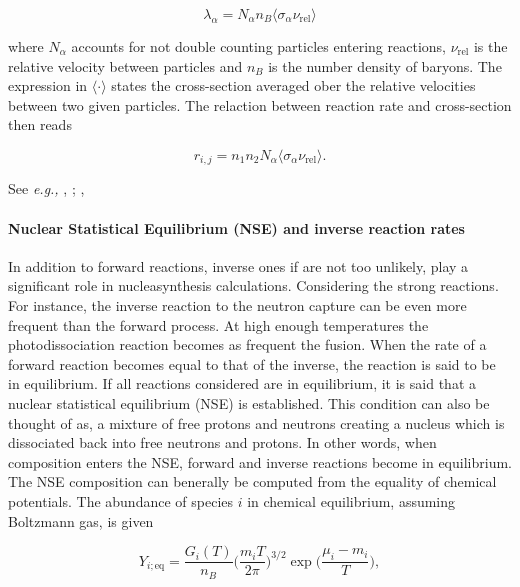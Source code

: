 \documentclass[11pt,a4paper,headinclude=true,DIV=14,BCOR=8mm,chapterprefix,listof=totoc,twoside,openright,abstracton]{scrbook}
\begin{document}
\begin{equation}
    \lambda_{\alpha} = N_{\alpha}n_{B}\langle\sigma_{\alpha}\nu_{\text{rel}}\rangle
\end{equation}

where $N_{\alpha}$ accounts for not double counting particles entering reactions, $\nu_{\text{rel}}$ is the relative velocity between particles and $n_B$ is the number density of baryons. The expression in $\langle\cdot\rangle$ states the cross-section averaged ober the relative velocities between two given particles. 
The relaction between reaction rate and cross-section then reads 

\begin{equation}
    r_{i,j} = n_1 n_2 N_{\alpha} \langle\sigma_{\alpha}\nu_{\text{rel}}\rangle.
\end{equation}

See \textit{e.g.,} \cite{Clayton:1968}, ; \cite{Rolfs:1988}, 

\paragraph{Nuclear Statistical Equilibrium (NSE) and inverse reaction rates}

In addition to forward reactions, inverse ones if are not too unlikely, play a significant role in nucleasynthesis calculations. Considering the strong reactions. For instance, the inverse reaction to the neutron capture can be even more frequent than the forward process. At high enough temperatures the photodissociation reaction becomes as frequent the fusion. 
When the rate of a forward reaction becomes equal to that of the inverse, the reaction is said to be in equilibrium. 
If all reactions considered are in equilibrium, it is said that a nuclear statistical equilibrium (NSE) is established. This condition can also be thought of as, a mixture of free protons and neutrons creating a nucleus which is dissociated back into free neutrons and protons. In other words, when composition enters the NSE, forward and inverse reactions become in equilibrium. The NSE composition can benerally be computed from the equality of chemical potentials. 
The abundance of species $i$ in chemical equilibrium, assuming Boltzmann gas, is given 

\begin{equation}
    Y_{i;\text{eq}} = \frac{G_i(T)}{n_B}\Bigg(\frac{m_i T}{2\pi}\Bigg)^{3/2}\exp\Bigg(\frac{\mu_i - m_i}{T}\Bigg),
\end{equation}
\end{document}

